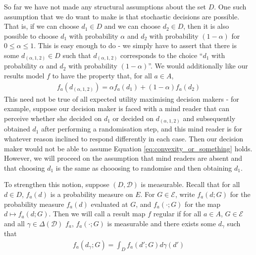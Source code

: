 So far we have not made any structural assumptions about the set $D$. One such assumption that we do want to make is that stochastic decisions are possible. That is, if we can choose $d_1\in D$ and we can choose $d_2 \in D$, then it is also possible to choose $d_1$ with probability $\alpha$ and $d_2$ with probability $(1-\alpha)$ for $0\leq \alpha \leq 1$. This is easy enough to do - we simply have to assert that there is some $d_{(\alpha,1,2)}\in D$ such that $d_{(\alpha,1,2)}$ corresponds to the choice ``$d_1$ with probability $\alpha$ and $d_2$ with probability $(1-\alpha)$''. We would additionally like our results model $f$ to have the property that, for all $a\in A$, 
\begin{align}
	f_a(d_{(\alpha,1,2)}) = \alpha f_a(d_1) + (1-\alpha) f_a(d_2) \label{eq:convexity_or_something}
\end{align}
This need not be true of all expected utility maximising decision makers - for example, suppose our decision maker is faced with a mind reader that can perceive whether she decided on $d_1$ or decided on $d_{(\alpha,1,2)}$ and subsequently obtained $d_1$ after performing a randomisation step, and this mind reader is for whatever reason inclined to respond differently in each case. Then our decision maker would not be able to assume Equation \ref{eq:convexity_or_something} holds. However, we will proceed on the assumption that mind readers are absent and that choosing $d_1$ is the same as chooosing to randomise and then obtaining $d_1$.


To strengthen this notion, suppose $(D,\mathcal{D})$ is measurable. Recall that for all $d\in D$, $f_a(d)$ is a probability measure on $E$. For $G\in \mathcal{E}$, write $f_a(d;G)$ for the probability measure $f_a(d)$ evaluated at $G$, and $f_a(\cdot;G)$ for the map $d\mapsto f_a(d;G)$. Then we will call a result map $f$ regular if for all $a\in A$, $G\in \mathcal{E}$ and all $\gamma\in \Delta(\mathcal{D})$ $f_a$, $f_a(\cdot;G)$ is measurable and there exists some $d_\gamma$ such that
\begin{align}
	f_a(d_\gamma;G) = \int_D f_a(d';G) d\gamma(d')
\end{align}


